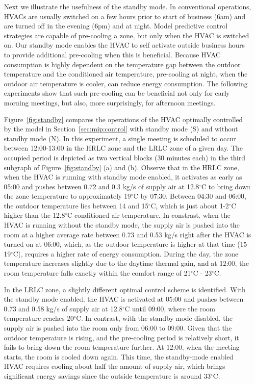Next we illustrate the usefulness of the standby mode. In conventional operations, HVACs are usually switched on a few hours prior to start of business (6am) and are turned off in the evening (6pm) and at night. Model predictive control strategies are capable of pre-cooling a zone, but only when the HVAC is switched on. Our standby mode enables the HVAC to self activate outside business hours to provide additional pre-cooling when this is beneficial. Because HVAC consumption is highly dependent on the temperature gap between the outdoor temperature and the conditioned air temperature, pre-cooling at night, when the outdoor air temperature is cooler, can reduce energy consumption. 
The following experiments show that such pre-cooling can be beneficial not only for early morning meetings, but also, more surprisingly, for afternoon meetings. 

Figure~\ref{fig:standby} compares the operations of the HVAC optimally controlled by the model in Section~\ref{sec:mip:control} with standby mode (S) and without standby mode (N). In this experiment, a single meeting is scheduled to occur between 12:00-13:00 in the HRLC zone and the LRLC zone of a given day. The occupied period is depicted as two vertical blocks (30 minutes each) in the third subgraph of Figure~\ref{fig:standby} (a) and (b). Observe that in the HRLC zone, when the HVAC is running with standby mode enabled, it activates as early as 05:00 and pushes between 0.72 and 0.3 kg/s of supply air at 12.8$^\circ$C to bring down the zone temperature to approximately 19$^\circ$C by 07:30. Between 04:30 and 06:00, the outdoor temperature lies between 14 and 15$^\circ$C, which is just about 1-2$^\circ$C higher than the 12.8$^\circ$C conditioned air temperature. In constrast, when the HVAC is running without the standby mode, the supply air is pushed into the room at a higher average rate between 0.73 and 0.53 kg/s right after the HVAC is turned on at 06:00, which, as the outdoor temperature is higher at that time (15-19$^\circ$C), requires a higher rate of energy consumption. During the day, the zone temperature increases slightly due to the daytime thermal gain, and at 12:00, the room temperature falls exactly within the comfort range of 21$^\circ$C - 23$^\circ$C. 

In the LRLC zone, a slightly different optimal control scheme is identified. With the standby mode enabled, the HVAC is activated at 05:00 and pushes between 0.73 and 0.58 kg/s of supply air at 12.8$^\circ$C until 09:00, where the room temperature reaches 20$^\circ$C. In contrast, with the standby mode disabled, the supply air is pushed into the room only from 06:00 to 09:00. Given that the outdoor temperature is rising, and the pre-cooling period is relatively short, it fails to bring down the room temperature further. At 12:00, when the meeting starts, the room is cooled down again. This time, the standby-mode enabled HVAC requires cooling about half the amount of supply air, which brings significant energy savings since the outside temperature is around 33$^\circ$C. 

